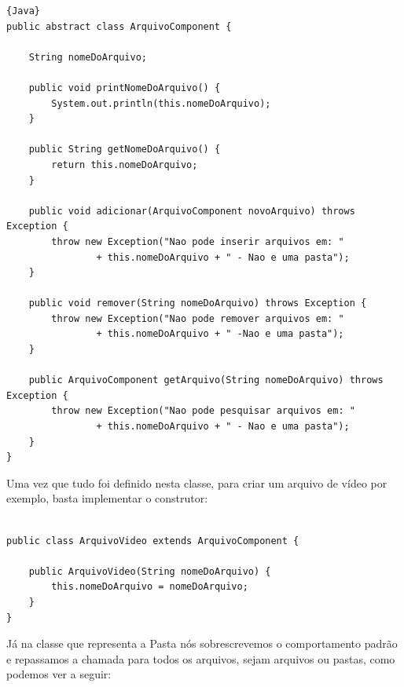 \documentclass{beamer}
\begin{document}
\begin{frame}[fragile]

\begin{lstlisting}{Java}
public abstract class ArquivoComponent {
 
    String nomeDoArquivo;
 
    public void printNomeDoArquivo() {
        System.out.println(this.nomeDoArquivo);
    }
 
    public String getNomeDoArquivo() {
        return this.nomeDoArquivo;
    }
 
    public void adicionar(ArquivoComponent novoArquivo) throws Exception {
        throw new Exception("Nao pode inserir arquivos em: "
                + this.nomeDoArquivo + " - Nao e uma pasta");
    }

    public void remover(String nomeDoArquivo) throws Exception {
        throw new Exception("Nao pode remover arquivos em: "
                + this.nomeDoArquivo + " -Nao e uma pasta");
    }
 
    public ArquivoComponent getArquivo(String nomeDoArquivo) throws Exception {
        throw new Exception("Nao pode pesquisar arquivos em: "
                + this.nomeDoArquivo + " - Nao e uma pasta");
    }
}

\end{lstlisting}

\end{frame}

\begin{frame}[fragile]

Uma vez que tudo foi definido nesta classe, para criar um arquivo de vídeo por exemplo, basta implementar o construtor:

\begin{lstlisting}

public class ArquivoVideo extends ArquivoComponent {
 
    public ArquivoVideo(String nomeDoArquivo) {
        this.nomeDoArquivo = nomeDoArquivo;
    }
}

\end{lstlisting}

Já na classe que representa a Pasta nós sobrescrevemos o comportamento padrão e repassamos a chamada para todos os arquivos, sejam arquivos ou pastas, como podemos ver a seguir:

\end{frame}
\end{document}
